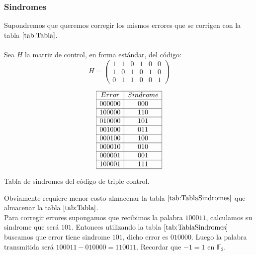 \subsubsection{Sindromes}

Supondremos que queremos corregir los mismos errores que se corrigen con la
tabla $\ref{tab:Tabla}$.\\ \\
%
Sea $H$ la matriz de control, en forma est\'andar, del c\'odigo:
\begin{displaymath}
H=\left( \begin{array}{cccccc}
1&1&0&1&0&0\\
1&0&1&0&1&0\\
0&1&1&0&0&1
\end{array} \right)
\end{displaymath}

\begin{table}[!h]
\begin{displaymath}
\begin{array}{|c|c|}
\hline
Error  & Sindrome \\
\hline
000000 & 000 \\
\hline
100000 & 110 \\
\hline
010000 & 101 \\
\hline
001000 & 011 \\
\hline
000100 & 100 \\
\hline
000010 & 010 \\
\hline
000001 & 001 \\
\hline
100001 & 111 \\
\hline
\end{array}
\end{displaymath}
\caption{Tabla de sindromes del c\'odigo de triple control.}\label{tab:TablaSindromes}
\end{table}
Obviamente requiere menor costo almacenar la tabla $\ref{tab:TablaSindromes}$
que almacenar la tabla $\ref{tab:Tabla}$.\\

Para corregir errores supongamos que recibimos la palabra $100011$, calculamos
su sindrome que ser\'a $101$. Entonces utilizando la tabla
$\ref{tab:TablaSindromes}$ buscamos que error tiene sindrome $101$, dicho error
es $010000$. Luego la palabra transmitida ser\'a $100011-010000=110011$.
Recordar que $-1=1$ en $\mathbb{F}_2$.

